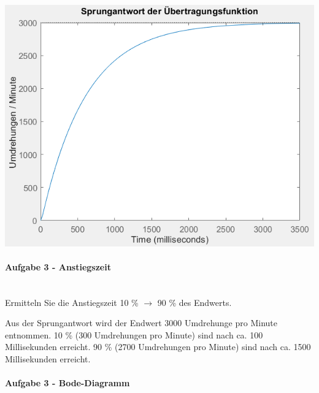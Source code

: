 \documentclass[            %
draft = false,             		%
paper = A4,                		%
pagesize = pdftex,         		%
fontsize = 10pt,           		%
DIV=15,                    		%
twoside = false,           		%
twocolumn = false,         		%
parskip = full,           		%
chapterprefix = false,      		%
appendixprefix = true,     		%
headinclude = false,       		%
footinclude = false,       		%
mpinclude = false,         		%
numbers = auto,            		%
cleardoublepage = plain,   		%
footnotes = multiple,      		%
titlepage = true,          		%
headings = normal,         		%
open = right,              		%
bibliography = openstyle,  		%
listof = chaptergapline,   		%
overfullrule = true,
]{scrbook}
\begin{document}
\begin{center}
   \begin{minipage}[b]{0.8\textwidth}
      \includegraphics[scale=1.0]{Bilder/Sprungantwort.PNG}
      \label{fig:Sprungantwort} 
   \end{minipage}
\end{center}







\paragraph{Aufgabe 3 - Anstiegszeit}~\\

Ermitteln Sie die Anstiegszeit 10 \% $\rightarrow$ 90 \% des Endwerts.

Aus der Sprungantwort wird der Endwert 3000 Umdrehunge pro Minute entnommen.
10 \% (300 Umdrehungen pro Minute) sind nach ca. 100 Millisekunden erreicht.
90 \% (2700 Umdrehungen pro Minute) sind nach ca. 1500 Millisekunden erreicht.






\paragraph{Aufgabe 3 - Bode-Diagramm}~\\
\end{document}
